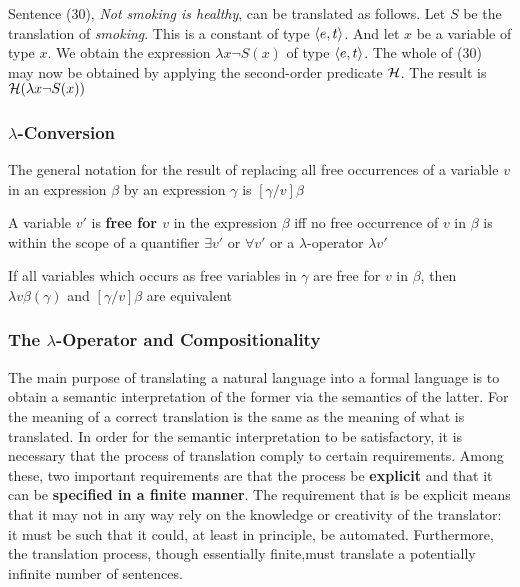 \documentclass[11pt]{article}
\begin{document}
Sentence (30), \emph{Not smoking is healthy}, can be translated as follows. Let
\(S\) be the translation of \emph{smoking}. This is a constant of type \(\langle
    e,t\rangle\). And let \(x\) be a variable of type \(x\). We obtain the
expression \(\lambda x\neg S(x)\) of type \(\langle e,t\rangle\). The whole of (30) may
now be obtained by applying the second-order predicate \(\mathcal{H}\). The result
is \(\mathcal{H}(\lambda x\neg S(x))\)
\subsubsection{\(λ\)-Conversion}
\label{sec:org72ee213}
The general notation for the result of replacing all free occurrences of a
variable \(v\) in an expression \(\beta\) by an expression \(\gamma\) is \([\gamma/v]\beta\)

\begin{definition}[]
A variable \(v'\) is \textbf{free for \(v\)}  in the expression \(\beta\) iff no free
occurrence of \(v\) in \(\beta\) is within the scope of a quantifier \(\exists v'\)
or \(\forall v'\) or a \(\lambda\)-operator \(\lambda v'\)
\end{definition}

\begin{theorem}[]
If all variables which occurs as free variables in \(\gamma\) are free for \(v\) in
\(\beta\), then \(\lambda v\beta(\gamma)\) and \([\gamma/v]\beta\) are equivalent
\end{theorem}
\subsubsection{The \(λ\)-Operator and Compositionality}
\label{sec:org130acb5}
The main purpose of translating a natural language into a formal language is
to obtain a semantic interpretation of the former via the semantics of the
latter. For the meaning of a correct translation is the same as the meaning
of what is translated. In order for the semantic interpretation to be
satisfactory, it is necessary that the process of translation comply to
certain requirements. Among these, two important requirements are that the
process be \textbf{explicit} and that it can be \textbf{specified in a finite manner}.  The
requirement that is be explicit means that it may not in any way rely on the
knowledge or creativity of the translator: it must be such that it could, at
least in principle, be automated. Furthermore, the translation process,
though essentially finite,must translate a potentially infinite number of
sentences.
\end{document}
